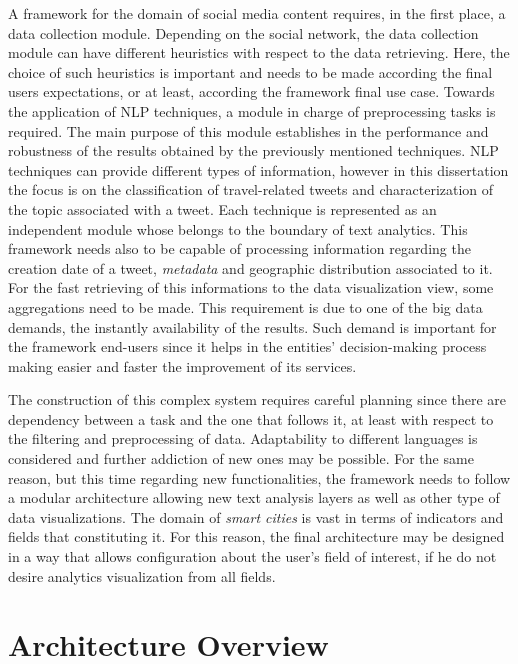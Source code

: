 A framework for the domain of social media content requires, in the first place, a data collection module. Depending on the social network, the data collection module can have different heuristics with respect to the data retrieving. Here, the choice of such heuristics is important and needs to be made according the final users expectations, or at least, according the framework final use case. Towards the application of \gls{NLP} techniques, a module in charge of preprocessing tasks is required. The main purpose of this module establishes in the performance and robustness of the results obtained by the previously mentioned techniques. \gls{NLP} techniques can provide different types of information, however in this dissertation the focus is on the classification of travel-related tweets and characterization of the topic associated with a tweet. Each technique is represented as an independent module whose belongs to the boundary of text analytics. This framework needs also to be capable of processing information regarding the creation date of a tweet, \textit{metadata} and geographic distribution associated to it. For the fast retrieving of this informations to the data visualization view, some aggregations need to be made. This requirement is due to one of the big data demands, the instantly availability of the results. Such demand is important for the framework end-users since it helps in the entities' decision-making process making easier and faster the improvement of its services.

The construction of this complex system requires careful planning since there are dependency between a task and the one that follows it, at least with respect to the filtering and preprocessing of data. Adaptability to different languages is considered and further addiction of new ones may be possible. For the same reason, but this time regarding new functionalities, the framework needs to follow a modular architecture allowing new text analysis layers as well as other type of data visualizations. The domain of \textit{smart cities} is vast in terms of indicators and fields that constituting it. For this reason, the final architecture may be designed in a way that allows configuration about the user's field of interest, if he do not desire analytics visualization from all fields.

\section{Architecture Overview}\label{sec:architecture}

